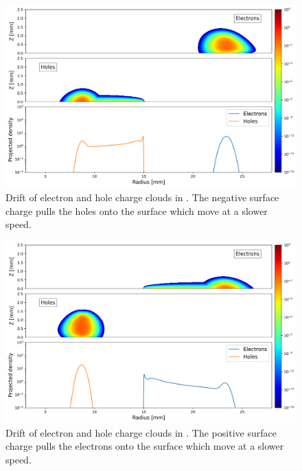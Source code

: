 \begin{figure}
    \includegraphics[trim={0cm 0 0cm 0},clip,width=0.99\linewidth]{ch3/figs/drift_path_sc=-0.3.png}
    \caption{Drift of electron and hole charge clouds in {\tdsim}. The negative surface charge pulls the holes onto the surface which move at a slower speed.}
    \label{ch3:fig:ehd_path_pd_sc-0.3}
\end{figure}



\begin{figure}
    \includegraphics[trim={0cm 0 0cm 0},clip,width=0.99\linewidth]{ch3/figs/drift_path_sc=0.3.png}
    \caption{Drift of electron and hole charge clouds in {\tdsim}. The positive surface charge pulls the electrons onto the surface which move at a slower speed.}
    \label{ch3:fig:ehd_path_pd_sc0.3}
\end{figure}

